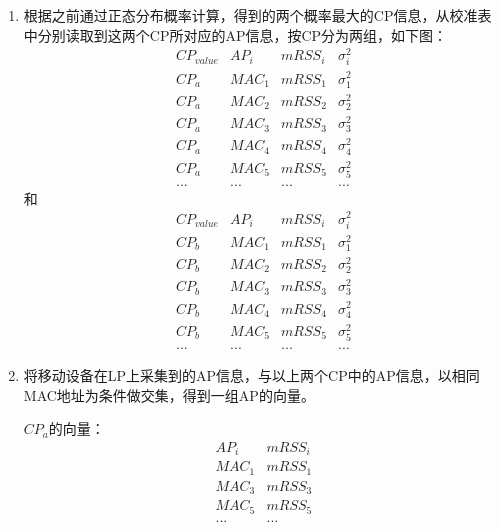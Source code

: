 \documentclass[UTF8, twocolumn ]{ctexart}
\begin{document}
\begin{enumerate}
\item 根据之前通过正态分布概率计算，得到的两个概率最大的CP信息，从校准表中分别读取到这两个CP所对应的AP信息，按CP分为两组，如下图：
  \begin{equation}
    \begin{array}{c|c|c|c}
      CP_{value} & AP_{i} & mRSS_{i} & \sigma^{2}_{i} \\ \hline
      CP_{a} & MAC_{1} & mRSS_{1} & \sigma^{2}_{1} \\
      CP_{a} & MAC_{2} & mRSS_{2} & \sigma^{2}_{2} \\
      CP_{a} & MAC_{3} & mRSS_{3} & \sigma^{2}_{3} \\
      CP_{a} & MAC_{4} & mRSS_{4} & \sigma^{2}_{4} \\
      CP_{a} & MAC_{5} & mRSS_{5} & \sigma^{2}_{5} \\
      ... & ... & ... & ...
    \end{array}
  \end{equation}
  和
  \begin{equation}
    \begin{array}{c|c|c|c}
      CP_{value} & AP_{i} & mRSS_{i} & \sigma^{2}_{i} \\ \hline
      CP_{b} & MAC_{1} & mRSS_{1} & \sigma^{2}_{1} \\
      CP_{b} & MAC_{2} & mRSS_{2} & \sigma^{2}_{2} \\
      CP_{b} & MAC_{3} & mRSS_{3} & \sigma^{2}_{3} \\
      CP_{b} & MAC_{4} & mRSS_{4} & \sigma^{2}_{4} \\
      CP_{b} & MAC_{5} & mRSS_{5} & \sigma^{2}_{5} \\
      ... & ... & ... & ...
    \end{array}
  \end{equation}
\item 将移动设备在LP上采集到的AP信息，与以上两个CP中的AP信息，以相同MAC地址为条件做交集，得到一组AP的向量。
  \par
  $CP_{a}$的向量：
  \begin{equation}
    \begin{array}{c|c}
      AP_{i} & mRSS_{i} \\ \hline
      MAC_{1} & mRSS_{1} \\
      MAC_{3} & mRSS_{3} \\
      MAC_{5} & mRSS_{5} \\
      ... & ...
    \end{array}

\end{equation}
\end{enumerate}
\end{document}

